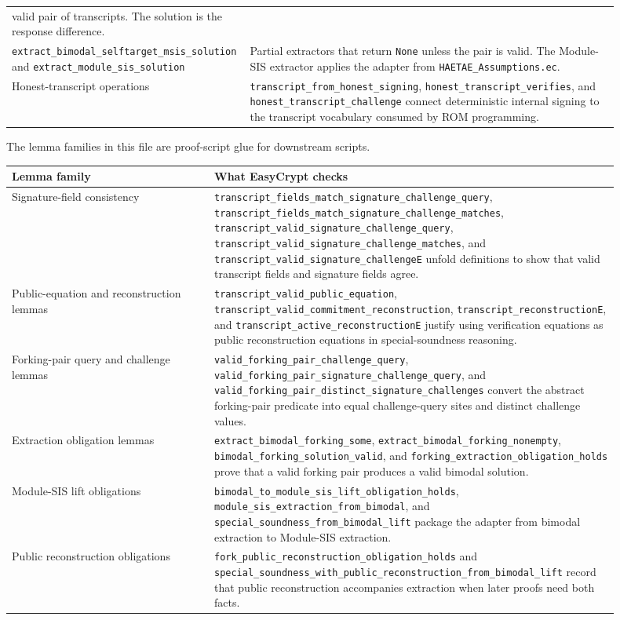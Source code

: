 \documentclass[11pt]{report}
\DeclareRobustCommand{\file}[1]{\ifmmode\text{\nolinkurl{#1}}\else\nolinkurl{#1}\fi}
\DeclareRobustCommand{\ec}[1]{\ifmmode\text{\nolinkurl{#1}}\else\nolinkurl{#1}\fi}
\theoremstyle{definition}
\theoremstyle{plain}
\begin{document}
\begin{longtable}{p{0.30\linewidth}p{0.60\linewidth}}
valid pair of transcripts.  The solution is the response difference. \\
\ec{extract\_bimodal\_selftarget\_msis\_solution} and
\ec{extract\_module\_sis\_solution} &
Partial extractors that return \ec{None} unless the pair is valid.  The
Module-SIS extractor applies the adapter from \file{HAETAE\_Assumptions.ec}. \\
Honest-transcript operations &
\ec{transcript\_from\_honest\_signing},
\ec{honest\_transcript\_verifies}, and
\ec{honest\_transcript\_challenge} connect deterministic internal signing to
the transcript vocabulary consumed by ROM programming. \\
\bottomrule
\end{longtable}

The lemma families in this file are proof-script glue for downstream scripts.

\begin{longtable}{p{0.30\linewidth}p{0.60\linewidth}}
\toprule
\textbf{Lemma family} & \textbf{What EasyCrypt checks} \\
\midrule
Signature-field consistency &
\ec{transcript\_fields\_match\_signature\_challenge\_query},
\ec{transcript\_fields\_match\_signature\_challenge\_matches},
\ec{transcript\_valid\_signature\_challenge\_query},
\ec{transcript\_valid\_signature\_challenge\_matches}, and
\ec{transcript\_valid\_signature\_challengeE} unfold definitions to show that
valid transcript fields and signature fields agree. \\
Public-equation and reconstruction lemmas &
\ec{transcript\_valid\_public\_equation},
\ec{transcript\_valid\_commitment\_reconstruction},
\ec{transcript\_reconstructionE}, and
\ec{transcript\_active\_reconstructionE} justify using verification equations
as public reconstruction equations in special-soundness reasoning. \\
Forking-pair query and challenge lemmas &
\ec{valid\_forking\_pair\_challenge\_query},
\ec{valid\_forking\_pair\_signature\_challenge\_query}, and
\ec{valid\_forking\_pair\_distinct\_signature\_challenges} convert the abstract
forking-pair predicate into equal challenge-query sites and distinct challenge
values. \\
Extraction obligation lemmas &
\ec{extract\_bimodal\_forking\_some},
\ec{extract\_bimodal\_forking\_nonempty},
\ec{bimodal\_forking\_solution\_valid}, and
\ec{forking\_extraction\_obligation\_holds} prove that a valid forking pair
produces a valid bimodal solution. \\
Module-SIS lift obligations &
\ec{bimodal\_to\_module\_sis\_lift\_obligation\_holds},
\ec{module\_sis\_extraction\_from\_bimodal}, and
\ec{special\_soundness\_from\_bimodal\_lift} package the adapter from bimodal
extraction to Module-SIS extraction. \\
Public reconstruction obligations &
\ec{fork\_public\_reconstruction\_obligation\_holds} and
\ec{special\_soundness\_with\_public\_reconstruction\_from\_bimodal\_lift}
record that public reconstruction accompanies extraction when later proofs need
both facts. \\
\bottomrule
\end{longtable}
\end{document}
